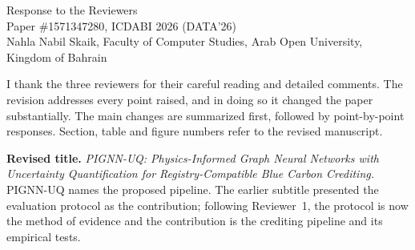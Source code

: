 \documentclass[10pt]{article}
\begin{document}
\begin{center}
{\Large Response to the Reviewers}\\[4pt]
Paper \#1571347280, ICDABI 2026 (DATA'26)\\
Nahla Nabil Skaik, Faculty of Computer Studies, Arab Open University, Kingdom of Bahrain
\end{center}

I thank the three reviewers for their careful reading and detailed comments. The revision addresses every point raised, and in doing so it changed the paper substantially. The main changes are summarized first, followed by point-by-point responses. Section, table and figure numbers refer to the revised manuscript.

\textbf{Revised title.} \emph{PIGNN-UQ: Physics-Informed Graph Neural Networks with Uncertainty Quantification for Registry-Compatible Blue Carbon Crediting.} PIGNN-UQ names the proposed pipeline. The earlier subtitle presented the evaluation protocol as the contribution; following Reviewer~1, the protocol is now the method of evidence and the contribution is the crediting pipeline and its empirical tests.
\end{document}
